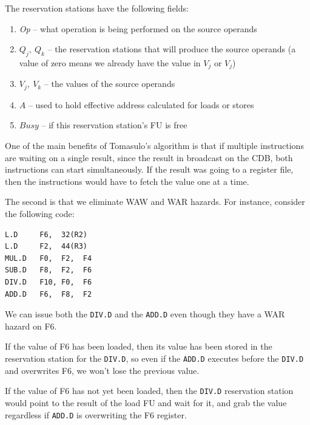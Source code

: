\documentclass{article}
\begin{document}
The reservation stations have the following fields:

\begin{enumerate}

\item \textit{Op} -- what operation is being performed on the source operands 

\item \textit{$Q_j,\ Q_k$} -- the reservation stations that will produce the source operands (a value of zero means we already have the value in $V_j$ or $V_j$)

\item \textit{$V_j,\ V_k$} -- the values of the source operands

\item \textit{$A$} -- used to hold effective address calculated for loads or stores

\item \textit{$Busy$} -- if this reservation station's FU is free

\end{enumerate}

One of the main benefits of Tomasulo's algorithm is that if multiple instructions are waiting on a single result, since the result in broadcast on the CDB, both instructions can start simultaneously. If the result was going to a register file, then the instructions would have to fetch the value one at a time. 

The second is that we eliminate WAW and WAR hazards. For instance, consider the following code: 

\begin{verbatim}
L.D     F6,  32(R2)
L.D     F2,  44(R3)
MUL.D   F0,  F2,  F4
SUB.D   F8,  F2,  F6
DIV.D   F10, F0,  F6
ADD.D   F6,  F8,  F2
\end{verbatim}

We can issue both the \texttt{DIV.D} and the \texttt{ADD.D} even though they have a WAR hazard on F6. 

If the value of F6 has been loaded, then its value has been stored in the reservation station for the \texttt{DIV.D}, so even if the \texttt{ADD.D} executes before the \texttt{DIV.D} and overwrites F6, we won't lose the previous value.

If the value of F6 has not yet been loaded, then the \texttt{DIV.D} reservation station would point to the result of the load FU and wait for it, and grab the value regardless if \texttt{ADD.D} is overwriting the F6 register.
\end{document}
